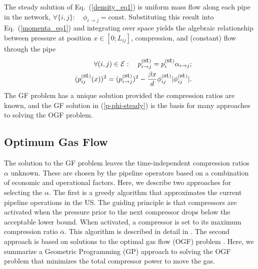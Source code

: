 \documentclass[10pt, conference, compsocconf]{IEEEtran}
\begin{document}
The steady solution of Eq.~(\ref{density_eq1}) is uniform mass flow along each pipe in the network, $\forall \{i,j\}:\quad \phi_{i\to j}=\mbox{const}$. Substituting this result into Eq.~(\ref{momenta_eq1}) and integrating over space yields the algebraic relationship between pressure at position $x\in[0;L_{ij}]$, compression, and (constant) flow through the pipe
\begin{eqnarray}
&& \hspace{-0.5cm}\forall (i,j)\in{\cal E}:\quad p_{i\to j}^{(\mbox{st})}=p_i^{(\mbox{st})} \alpha_{i\to j}; \nonumber\\ &&
(p_{ij}^{(\mbox{st})}(x))^2=(p_{i\to j}^{(\mbox{st})})^2-\frac{\beta x}{d} \phi_{ij}^{(\mbox{st})}|\phi_{ij}^{(\mbox{st})}|.
\label{p-phi-steady}
\end{eqnarray}
The GF problem has a unique solution provided the compression ratios are known, and the GF solution in (\ref{p-phi-steady}) is the basis for many approaches to solving the OGF problem.

\subsection{Optimum Gas Flow}

The solution to the GF problem leaves the time-independent compression ratios $\alpha$ unknown.  These are chosen by the pipeline operators based on a combination of economic and operational factors. Here, we describe two approaches for selecting the $\alpha$.  The first is a greedy algorithm that approximates the current pipeline operations in the US.  The guiding principle is that compressors are activated when the pressure prior to the next compressor drops below the acceptable lower bound.  When activated, a compressor is set to its maximum compression ratio $\overline{\alpha}$. This algorithm is described in detail in \cite{13MFBBCP}. The second approach is based on solutions to the optimal gas flow (OGF) problem \cite{68WL,00WRBS,10Bor,13MFBBCP}.  Here, we summarize a Geometric Programming (GP) approach to solving the OGF problem that minimizes the total compressor power to move the gas.
\end{document}
